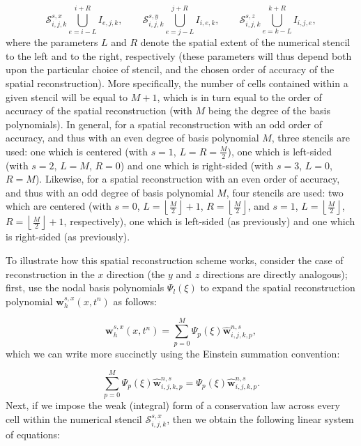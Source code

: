 \documentclass{article}
\begin{document}
\begin{equation}
\mathcal{S}_{i, j, k}^{s, x} \bigcup_{e = i - L}^{i + R} I_{e, j, k}, \qquad \mathcal{S}_{i, j, k}^{s, y} \bigcup_{e = j - L}^{j + R} I_{i, e, k}, \qquad \mathcal{S}_{i, j, k}^{s, z} \bigcup_{e = k - L}^{k + R} I_{i, j, e},
\end{equation}
where the parameters $L$ and $R$ denote the spatial extent of the numerical stencil to the left and to the right, respectively (these parameters will thus depend both upon the particular choice of stencil, and the chosen order of accuracy of the spatial reconstruction). More specifically, the number of cells contained within a given stencil will be equal to ${M + 1}$, which is in turn equal to the order of accuracy of the spatial reconstruction (with $M$ being the degree of the basis polynomials). In general, for a spatial reconstruction with an odd order of accuracy, and thus with an even degree of basis polynomial $M$, three stencils are used: one which is centered (with ${s = 1}$, ${L = R = \frac{M}{2}}$), one which is left-sided (with ${s = 2}$, ${L = M}$, ${R = 0}$) and one which is right-sided (with ${s = 3}$, ${L = 0}$, ${R = M}$). Likewise, for a spatial reconstruction with an even order of accuracy, and thus with an odd degree of basis polynomial $M$, four stencils are used: two which are centered (with ${s = 0}$, ${L = \left\lfloor \frac{M}{2} \right\rfloor + 1}$, ${R = \left\lfloor \frac{M}{2} \right\rfloor}$, and ${s = 1}$, ${L = \left\lfloor \frac{M}{2} \right\rfloor}$, ${R = \left\lfloor \frac{M}{2} \right\rfloor + 1}$, respectively), one which is left-sided (as previously) and one which is right-sided (as previously).

To illustrate how this spatial reconstruction scheme works, consider the case of reconstruction in the $x$ direction (the $y$ and $z$ directions are directly analogous); first, use the nodal basis polynomials ${\Psi_{l} \left( \xi \right)}$ to expand the spatial reconstruction polynomial ${\mathbf{w}_{h}^{s, x} \left( x, t^n \right)}$ as follows:

\begin{equation}
\mathbf{w}_{h}^{s, x} \left( x, t^n \right) = \sum_{p = 0}^{M} \Psi_p \left( \xi \right) \hat{\mathbf{w}}_{i, j, k, p}^{n, s},
\end{equation}
which we can write more succinctly using the Einstein summation convention:

\begin{equation}
\sum_{p = 0}^{M} \Psi_p \left( \xi \right) \hat{\mathbf{w}}_{i, j, k, p}^{n, s} = \Psi_p \left( \xi \right) \hat{\mathbf{w}}_{i, j, k, p}^{n, s}.
\end{equation}
Next, if we impose the weak (integral) form of a conservation law across every cell within the numerical stencil ${\mathcal{S}_{i, j, k}^{s, x}}$, then we obtain the following linear system of equations:
\end{document}
